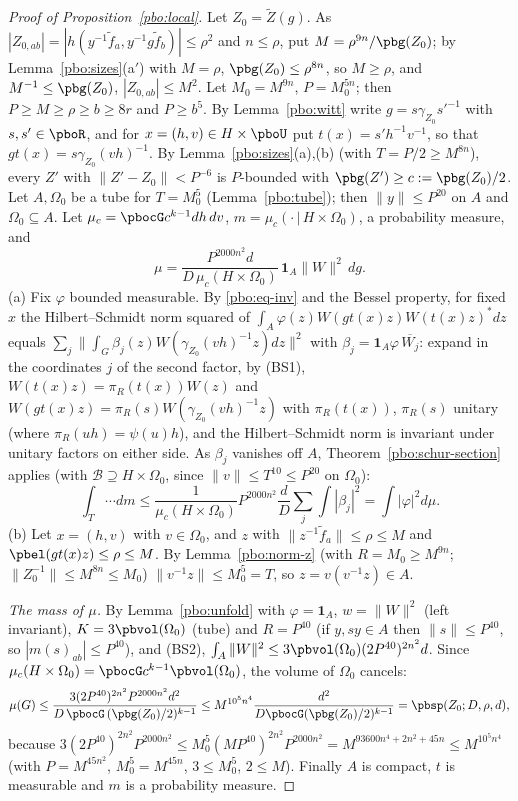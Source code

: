 \documentclass[10pt]{amsart}
\theoremstyle{definition}
\theoremstyle{remark}
\providecommand{\aubar}[1]{\overline{#1}}
\begin{document}
\begin{proof}[Proof of Proposition~\ref{pbo:local}]
Let $Z_0=\tilde Z(g)$. As $|Z_{0,ab}|=|h(y^{-1}\tilde f_a,y^{-1}g\tilde f_b)|\le\rho^2$ and $n\le\rho$, put
$M=\rho^{9n}/\pbg(Z_0)$; by Lemma~\ref{pbo:sizes}(a$'$) with $M=\rho$, $\pbg(Z_0)\le\rho^{8n}$, so $M\ge\rho$, and $M^{-1}\le
\pbg(Z_0)$, $|Z_{0,ab}|\le M^2$. Let $M_0=M^{9n}$, $P=M_0^{5n}$; then $P\ge M\ge\rho\ge b\ge8r$ and $P\ge
b^5$. By Lemma~\ref{pbo:witt} write $g=s\gamma_{Z_0}s'^{-1}$ with $s,s'\in\pboR$, and for $x=(h,v)\in H\times
\pboU$ put $t(x)=s'h^{-1}v^{-1}$, so that $gt(x)=s\gamma_{Z_0}(vh)^{-1}$. By Lemma~\ref{pbo:sizes}(a),(b)
(with $T=P/2\ge M^{8n}$), every $Z'$ with $\|Z'-Z_0\|<P^{-6}$ is $P$-bounded with $\pbg(Z')\ge c:=\pbg(Z_0)/2$.
Let $A,\Omega_0$ be a tube for $T=M_0^5$ (Lemma~\ref{pbo:tube}); then $\|y\|\le P^{20}$ on $A$ and $\Omega_0
\subseteq A$. Let $\mu_c=\pbocG c^{k-1}dh\,dv$, $m=\mu_c(\cdot\,|\,H\times\Omega_0)$, a probability measure, and
\[
\mu=\frac{P^{2000n^2}d}{D\,\mu_c(H\times\Omega_0)}\,\mathbf 1_A\|W\|^2\,dg .
\]
(a) Fix $\varphi$ bounded measurable. By \eqref{pbo:eq-inv} and the Bessel property, for fixed $x$ the
Hilbert--Schmidt norm squared of $\int_A\varphi(z)W(gt(x)z)W(t(x)z)^*dz$ equals $\sum_j\|\int_G\beta_j(z)
W(\gamma_{Z_0}(vh)^{-1}z)dz\|^2$ with $\beta_j=\mathbf 1_A\varphi\,\aubar{W_j}$: expand in the coordinates $j$
of the second factor, by \textup{(BS1)}, $W(t(x)z)=\pi_R(t(x))W(z)$ and $W(gt(x)z)=\pi_R(s)W(\gamma_{Z_0}(vh)^{-1}z)$ with
$\pi_R(t(x))$, $\pi_R(s)$ unitary (where $\pi_R(uh)=\psi(u)h$), and the Hilbert--Schmidt norm is invariant
under unitary factors on either side. As $\beta_j$ vanishes off $A$, Theorem~\ref{pbo:schur-section} applies (with
$\mathcal B\supseteq H\times\Omega_0$, since $\|v\|\le T^{10}\le P^{20}$ on $\Omega_0$):
\[
\int_T\cdots dm\le\frac1{\mu_c(H\times\Omega_0)}P^{2000n^2}\frac dD\sum_j\int|\beta_j|^2=\int|\varphi|^2d\mu .
\]
(b) Let $x=(h,v)$ with $v\in\Omega_0$, and $z$ with $\|z^{-1}\tilde f_a\|\le\rho\le M$ and $\pbel(gt(x)z)\le\rho
\le M$. By Lemma~\ref{pbo:norm-z} (with $R=M_0^{\,}\ge M^{9n}$; $\|Z_0^{-1}\|\le M^{8n}\le M_0$) $\|v^{-1}z\|\le
M_0^5=T$, so $z=v(v^{-1}z)\in A$.

\emph{The mass of $\mu$.} By Lemma~\ref{pbo:unfold} with $\varphi=\mathbf 1_A$, $w=\|W\|^2$ (left invariant), $K=3
\pbvol(\Omega_0)$ (tube) and $R=P^{40}$ (if $y,sy\in A$ then $\|s\|\le P^{40}$, so $|m(s)_{ab}|\le P^{40}$), and
(BS2), $\int_A\|W\|^2\le3\pbvol(\Omega_0)(2P^{40})^{2n^2}d$. Since $\mu_c(H\times\Omega_0)=\pbocG c^{k-1}\pbvol(
\Omega_0)$, the volume of $\Omega_0$ cancels:
\[
\mu(G)\le\frac{3(2P^{40})^{2n^2}P^{2000n^2}d^2}{D\,\pbocG\,(\pbg(Z_0)/2)^{k-1}}\le M^{10^5n^4}\frac{d^2}{D\pbocG(
\pbg(Z_0)/2)^{k-1}}=\pbsp(Z_0;D,\rho,d),
\]
because $3(2P^{40})^{2n^2}P^{2000n^2}\le M_0^5(M P^{40})^{2n^2}P^{2000n^2}=M^{93600n^4+2n^2+45n}\le M^{10^5n^4}$
(with $P=M^{45n^2}$, $M_0^5=M^{45n}$, $3\le M_0^5$, $2\le M$). Finally $A$ is compact, $t$ is measurable
and $m$ is a probability measure.
\end{proof}
\end{document}
